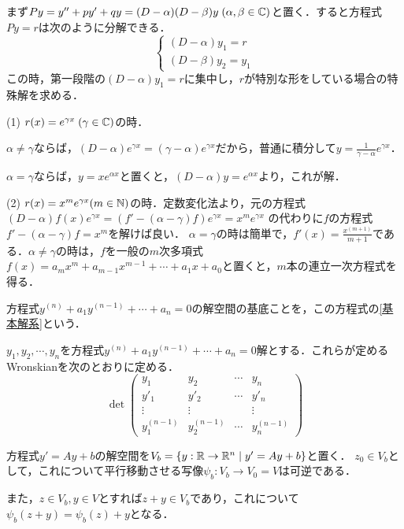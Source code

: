 \documentclass[uplatex,dvipdfmx]{jsreport}
\begin{document}
\begin{example}[特別な形をした非斉次項の場合の特殊解]
    まず$Py=y''+py'+qy=(D-\alpha)(D-\beta)y\;(\alpha,\beta\in\mathbb{C})$と置く．すると方程式$Py=r$は次のように分解できる．
    \[\begin{cases}
        (D-\alpha)y_1 = r\\
        (D-\beta)y_2 = y_1
    \end{cases}\]
    この時，第一段階の$(D-\alpha)y_1=r$に集中し，$r$が特別な形をしている場合の特殊解を求める．

    (1) $r(x)=e^{\gamma x}\;(\gamma\in\mathbb{C})$の時．

    $\alpha\ne\gamma$ならば，$(D-\alpha)e^{\gamma x}=(\gamma - \alpha)e^{\gamma x}$だから，普通に積分して$y=\frac{1}{\gamma-\alpha}e^{\gamma x}$．

    $\alpha=\gamma$ならば，$y=xe^{\alpha x}$と置くと，$(D-\alpha)y=e^{\alpha x}$より，これが解．

    (2) $r(x)=x^me^{\gamma x}(m\in\mathbb{N})$の時．定数変化法より，元の方程式$(D-\alpha)f(x)e^{\gamma x}=(f'-(\alpha -\gamma)f)e^{\gamma x}=x^me^{\gamma x}$
    の代わりに$f$の方程式$f'-(\alpha-\gamma)f=x^m$を解けば良い．
    $\alpha=\gamma$の時は簡単で，$f'(x)=\frac{x^(m+1)}{m+1}$である．$\alpha\ne\gamma$の時は，$f$を一般の$m$次多項式$f(x)=a_mx^m+a_{m-1}x^{m-1}+\cdots+a_1x+a_0$と置くと，$m$本の連立一次方程式を得る．
\end{example}

\begin{definition}[基本解]
    方程式$y^{(n)}+a_1y^{(n-1)}+\cdots+a_n=0$の解空間の基底ことを，この方程式の\ref{基本解系}という．
\end{definition}
\begin{definition}[Wronskian]
    $y_1,y_2,\cdots,y_n$を方程式$y^{(n)}+a_1y^{(n-1)}+\cdots+a_n=0$解とする．これらが定めるWronskianを次のとおりに定める．
    \[ \det\begin{pmatrix}y_1&y_2&\cdots&y_n\\y'_1&y'_2&\cdots&y'_n\\\vdots&\vdots&&\vdots\\y^{(n-1)}_1&y^{(n-1)}_2&\cdots&y^{(n-1)}_n\end{pmatrix} \]
\end{definition}

\begin{theorem}[非斉次線型微分方程式系]
    方程式$y'=Ay+b$の解空間を$V_b=\{y:\mathbb{R}\to\mathbb{R}^n\mid y'=Ay+b\}$と置く．
    $z_0\in V_b$として，これについて平行移動させる写像$\psi_b:V_b\to V_0=V$は可逆である．
    \begin{center}
    \end{center}

    また，$z\in V_b,y\in V$とすれば$z+y\in V_b$であり，これについて$\psi_b(z+y)=\psi_b(z)+y$となる．
\end{theorem}
\end{document}
